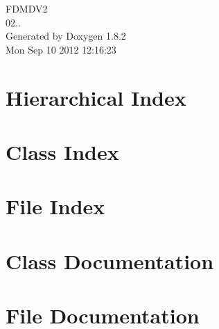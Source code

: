 \documentclass{book}
\begin{document}
\hypersetup{pageanchor=false,citecolor=blue}
\begin{titlepage}
\vspace*{7cm}
\begin{center}
{\Large F\-D\-M\-D\-V2 \\[1ex]\large 02.. }\\
\vspace*{1cm}
{\large Generated by Doxygen 1.8.2}\\
\vspace*{0.5cm}
{\small Mon Sep 10 2012 12:16:23}\\
\end{center}
\end{titlepage}
\clearemptydoublepage
{}
\tableofcontents
\clearemptydoublepage
{}
\hypersetup{pageanchor=true,citecolor=blue}
\chapter{Hierarchical Index}

\chapter{Class Index}

\chapter{File Index}

\chapter{Class Documentation}































\chapter{File Documentation}


\printindex
\end{document}
